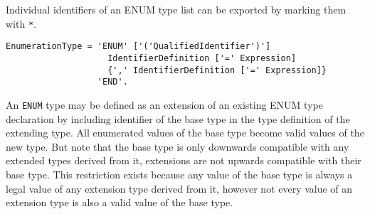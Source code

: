 \documentclass[a4wide,11pt]{article}
\begin{document}
Individual identifiers of an ENUM type list can be exported by marking them with \lstinline"*".

\begin{lstlisting}[style=ebnf]
EnumerationType = 'ENUM' ['('QualifiedIdentifier')']
                    IdentifierDefinition ['=' Expression]
                    {',' IdentifierDefinition ['=' Expression]}
                  'END'.
\end{lstlisting}

An \lstinline"ENUM" type may be defined as an extension of an existing ENUM type declaration by including identifier of the base type in the type definition of the extending type.
All enumerated values of the base type become valid values of the new type.
But note that the base type is only downwards compatible with any extended types derived from it, extensions are not upwards compatible with their base type.
This restriction exists because any value of the base type is always a legal value of any extension type derived from it, however not every value of an extension type is also a valid value of the base type.
\end{document}
